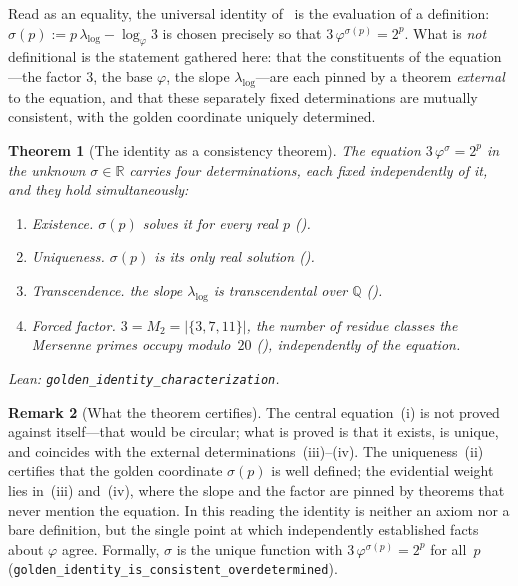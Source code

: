 \documentclass[11pt]{amsart}
\newtheorem{Theorem}{Theorem}[section]
\theoremstyle{definition}
\newtheorem{Remark}[Theorem]{Remark}
\newcommand{\golden}{\varphi}
\newcommand{\lean}[1]{\texttt{#1}}
\begin{document}
Read as an equality, the universal identity of~ is the
evaluation of a definition: $\sigma(p):=p\,\lambda_{\log}-\log_{\golden}3$ is
chosen precisely so that $3\,\golden^{\sigma(p)}=2^{p}$.  What is \emph{not}
definitional is the statement gathered here: that the constituents of the
equation---the factor $3$, the base $\golden$, the slope
$\lambda_{\log}$---are each pinned by a theorem \emph{external} to the
equation, and that these separately fixed determinations are mutually
consistent, with the golden coordinate uniquely determined.

\begin{Theorem}[The identity as a consistency theorem]\label{thm:characterization}
The equation $3\,\golden^{\sigma}=2^{p}$ in the unknown $\sigma\in\mathbb{R}$
carries four determinations, each fixed independently of it, and they hold
simultaneously:
\begin{enumerate}
\item[\textup{(i)}] \emph{Existence.} $\sigma(p)$ solves it for every real
  $p$ ().
\item[\textup{(ii)}] \emph{Uniqueness.} $\sigma(p)$ is its only real
  solution ().
\item[\textup{(iii)}] \emph{Transcendence.} the slope $\lambda_{\log}$ is
  transcendental over $\mathbb{Q}$ ().
\item[\textup{(iv)}] \emph{Forced factor.} $3=M_{2}=|\{3,7,11\}|$, the number
  of residue classes the Mersenne primes occupy modulo~$20$
  (), independently of the equation.
\end{enumerate}
\emph{Lean:} \lean{golden\_identity\_characterization}.
\end{Theorem}

\begin{Remark}[What the theorem certifies]\label{rem:characterization}
The central equation~(i) is not proved against itself---that would be
circular; what is proved is that it exists, is unique, and coincides with
the external determinations~(iii)--(iv).  The uniqueness~(ii) certifies that
the golden coordinate $\sigma(p)$ is well defined; the evidential weight
lies in~(iii) and~(iv), where the slope and the factor are pinned by
theorems that never mention the equation.  In this reading the identity is
neither an axiom nor a bare definition, but the single point at which
independently established facts about $\golden$ agree.  Formally, $\sigma$
is the unique function with $3\,\golden^{\sigma(p)}=2^{p}$ for all~$p$
(\lean{golden\_identity\_is\_consistent\_overdetermined}).
\end{Remark}
\end{document}
